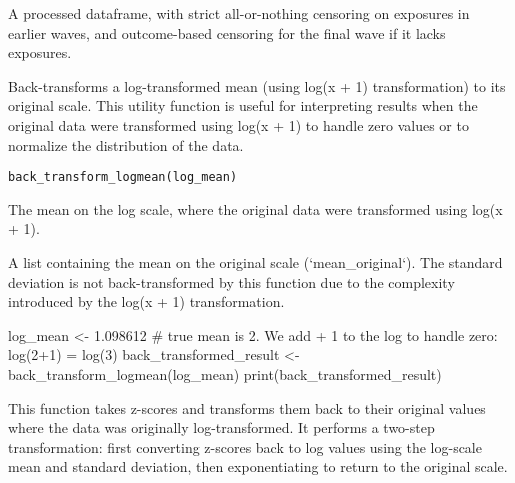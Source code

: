 \documentclass[a4paper]{book}
\begin{document}
%
\begin{Value}
A processed dataframe, with strict all-or-nothing censoring on exposures in earlier waves,
and outcome-based censoring for the final wave if it lacks exposures.
\end{Value}
%
\begin{Description}
Back-transforms a log-transformed mean (using log(x + 1) transformation) to its original scale.
This utility function is useful for interpreting results when the original data were transformed using log(x + 1)
to handle zero values or to normalize the distribution of the data.
\end{Description}
%
\begin{Usage}
\begin{verbatim}
back_transform_logmean(log_mean)
\end{verbatim}
\end{Usage}
%
\begin{Arguments}
\begin{ldescription}
\item[\code{log\_mean}] The mean on the log scale, where the original data were transformed using log(x + 1).
\end{ldescription}
\end{Arguments}
%
\begin{Value}
A list containing the mean on the original scale (`mean\_original`).
The standard deviation is not back-transformed by this function due to the complexity introduced by the log(x + 1) transformation.
\end{Value}
%
\begin{Examples}
\begin{ExampleCode}
log_mean <- 1.098612 # true mean is 2. We add + 1 to the log to handle zero: log(2+1) = log(3)
back_transformed_result <- back_transform_logmean(log_mean)
print(back_transformed_result)

\end{ExampleCode}
\end{Examples}
%
\begin{Description}
This function takes z-scores and transforms them back to their original values
where the data was originally log-transformed. It performs a two-step transformation:
first converting z-scores back to log values using the log-scale mean and standard deviation,
then exponentiating to return to the original scale.
\end{Description}
\end{document}
